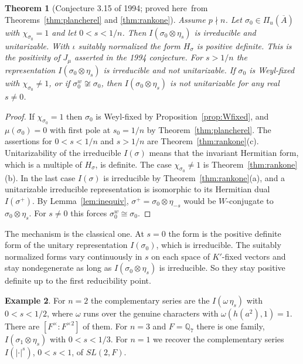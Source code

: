 \documentclass[12pt,letterpaper]{article}
\numberwithin{equation}{section}
\newtheorem{theorem}{Theorem}[section]
\theoremstyle{definition}
\newtheorem{xexample}[theorem]{Example}
\newcommand{\proved}{proved here}
\newcommand{\Q}{\mathbb Q}
\newcommand{\bA}{\overline{A}}
\begin{document}
\begin{theorem}[Conjecture 3.15 of 1994; \proved\ from Theorems~\ref{thm:plancherel} and
\ref{thm:rankone}]\label{thm:complementary}
Assume $p\nmid n$.  Let $\sigma_0\in\Pi_u(\bA)$ with $\chi_{\sigma_0}=1$ and let $0<s<1/n$.
Then $I(\sigma_0\otimes\eta_s)$ is irreducible and unitarizable.  With $\iota$ suitably
normalized the form $H_\sigma$ is positive definite.  This is the positivity of $J_\mu$
asserted in the 1994 conjecture.  For $s>1/n$ the representation
$I(\sigma_0\otimes\eta_s)$ is irreducible and not unitarizable.  If $\sigma_0$ is
Weyl-fixed with $\chi_{\sigma_0}\ne1$, or if $\sigma_0^w\not\cong\sigma_0$, then
$I(\sigma_0\otimes\eta_s)$ is not unitarizable for any real $s\ne0$.
\end{theorem}
\begin{proof}
If $\chi_{\sigma_0}=1$ then $\sigma_0$ is Weyl-fixed by Proposition~\ref{prop:Wfixed}, and
$\mu(\sigma_0)=0$ with first pole at $s_0=1/n$ by Theorem~\ref{thm:plancherel}.  The
assertions for $0<s<1/n$ and $s>1/n$ are Theorem~\ref{thm:rankone}(c).  Unitarizability of
the irreducible $I(\sigma)$ means that the invariant Hermitian form, which is a multiple
of $H_\sigma$, is definite.  The case $\chi_{\sigma_0}\ne1$ is Theorem~\ref{thm:rankone}(b).
In the last case $I(\sigma)$ is irreducible by Theorem~\ref{thm:rankone}(a), and a unitarizable irreducible representation
is isomorphic to its Hermitian dual $I(\sigma^+)$.  By Lemma~\ref{lem:inequiv},
$\sigma^+=\sigma_0\otimes\eta_{-s}$ would be $W$-conjugate to $\sigma_0\otimes\eta_s$.  For
$s\ne0$ this forces $\sigma_0^w\cong\sigma_0$.
\end{proof}
The mechanism is the classical one.  At $s=0$ the form is the positive definite form of
the unitary representation $I(\sigma_0)$, which is irreducible.  The suitably normalized
forms vary continuously in $s$ on each space of $K'$-fixed vectors and stay nondegenerate
as long as $I(\sigma_0\otimes\eta_s)$ is irreducible.  So they stay positive definite up to
the first reducibility point.

\begin{xexample}
For $n=2$ the complementary series are the $I(\omega\,\eta_s)$ with $0<s<1/2$, where
$\omega$ runs over the genuine characters with $\omega(h(a^2),1)=1$.  There are
$[F^\times:F^{\times2}]$ of them.  For $n=3$ and $F=\Q_7$ there is one family,
$I(\sigma_1\otimes\eta_s)$ with $0<s<1/3$.  For $n=1$ we recover the complementary series
$I(|\cdot|^s)$, $0<s<1$, of $SL(2,F)$.
\end{xexample}
\end{document}
